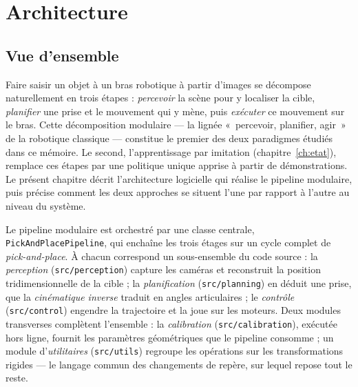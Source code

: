\chapter{Architecture}
\label{ch:architecture}
\section{Vue d'ensemble}
\label{sec:vue-ensemble}

Faire saisir un objet à un bras robotique à partir d'images se décompose naturellement en trois étapes : \emph{percevoir} la scène pour y localiser la cible, \emph{planifier} une prise et le mouvement qui y mène, puis \emph{exécuter} ce mouvement sur le bras. Cette décomposition modulaire --- la lignée «~percevoir, planifier, agir~» de la robotique classique --- constitue le premier des deux paradigmes étudiés dans ce mémoire. Le second, l'apprentissage par imitation (chapitre~\ref{ch:etat}), remplace ces étapes par une politique unique apprise à partir de démonstrations. Le présent chapitre décrit l'architecture logicielle qui réalise le pipeline modulaire, puis précise comment les deux approches se situent l'une par rapport à l'autre au niveau du système.

Le pipeline modulaire est orchestré par une classe centrale, \texttt{PickAndPlacePipeline}, qui enchaîne les trois étages sur un cycle complet de \emph{pick-and-place}. À chacun correspond un sous-ensemble du code source : la \emph{perception} (\texttt{src/perception}) capture les caméras et reconstruit la position tridimensionnelle de la cible ; la \emph{planification} (\texttt{src/planning}) en déduit une prise, que la \emph{cinématique inverse} traduit en angles articulaires ; le \emph{contrôle} (\texttt{src/control}) engendre la trajectoire et la joue sur les moteurs. Deux modules transverses complètent l'ensemble : la \emph{calibration} (\texttt{src/calibration}), exécutée hors ligne, fournit les paramètres géométriques que le pipeline consomme ; un module d'\emph{utilitaires} (\texttt{src/utils}) regroupe les opérations sur les transformations rigides --- le langage commun des changements de repère, sur lequel repose tout le reste.



